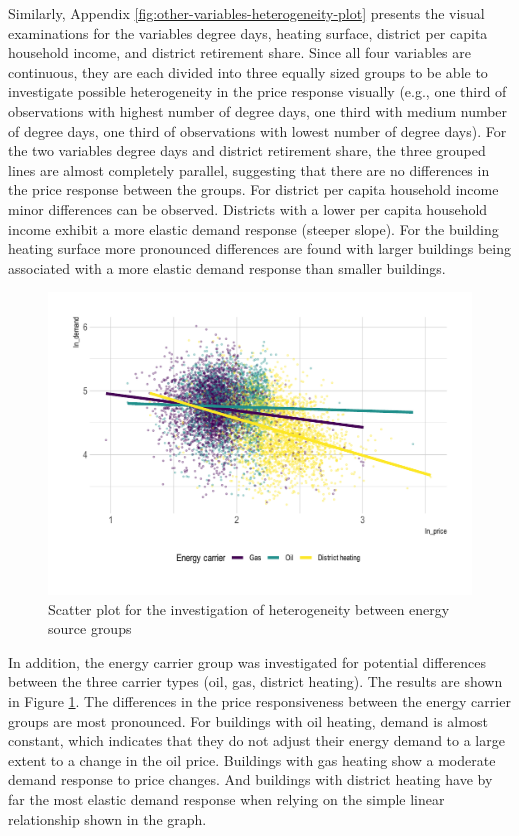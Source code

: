 \documentclass[12pt,twoside]{reedthesis}
\begin{document}
Similarly, Appendix \ref{fig:other-variables-heterogeneity-plot} presents the visual examinations for the variables degree days, heating surface, district per capita household income, and district retirement share. Since all four variables are continuous, they are each divided into three equally sized groups to be able to investigate possible heterogeneity in the price response visually (e.g., one third of observations with highest number of degree days, one third with medium number of degree days, one third of observations with lowest number of degree days). For the two variables degree days and district retirement share, the three grouped lines are almost completely parallel, suggesting that there are no differences in the price response between the groups. For district per capita household income minor differences can be observed. Districts with a lower per capita household income exhibit a more elastic demand response (steeper slope). For the building heating surface more pronounced differences are found with larger buildings being associated with a more elastic demand response than smaller buildings.
\begin{figure}

{\centering \includegraphics[width=0.8\linewidth]{figure/carrier_heterogeneity_plot} 

}

\caption{Scatter plot for the investigation of heterogeneity between energy source groups}\label{fig:heterogeneity-energy-carrier-plot}
\end{figure}
In addition, the energy carrier group was investigated for potential differences between the three carrier types (oil, gas, district heating). The results are shown in Figure \ref{fig:heterogeneity-energy-carrier-plot}. The differences in the price responsiveness between the energy carrier groups are most pronounced. For buildings with oil heating, demand is almost constant, which indicates that they do not adjust their energy demand to a large extent to a change in the oil price. Buildings with gas heating show a moderate demand response to price changes. And buildings with district heating have by far the most elastic demand response when relying on the simple linear relationship shown in the graph.
\end{document}
